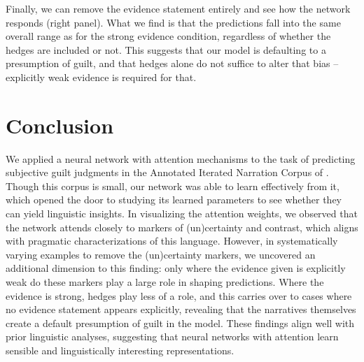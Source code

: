 \documentclass[11pt,a4paper]{article}
\newcommand{\jd}[1]{\textcolor{Red}{[jd: #1]}}
\begin{document}
Finally, we can remove the evidence statement entirely and see how the network responds (right panel). What we find is that the predictions fall into the same overall range as for the strong evidence condition, regardless of whether the hedges are included or not. This suggests that our model is defaulting to a presumption of guilt, and that hedges alone do not suffice to alter that bias -- explicitly weak evidence is required for that.


\section{Conclusion}

We applied a neural network with attention mechanisms to the task of predicting subjective guilt judgments in the Annotated Iterated Narration Corpus of \citet{Kreiss:2019}. Though this corpus is small, our network was able to learn effectively from it, which opened the door to studying its learned parameters to see whether they can yield linguistic insights. In visualizing the attention weights, we observed that the network attends closely to markers of (un)certainty and contrast, which aligns with pragmatic characterizations of this language. However, in systematically varying examples to remove the (un)certainty markers, we uncovered an additional dimension to this finding: only where the evidence given is explicitly weak do these markers play a large role in shaping predictions. Where the evidence is strong, hedges play less of a role, and this carries over to cases where no evidence statement appears explicitly, revealing that the narratives themselves create a default presumption of guilt in the model. These findings align well with prior linguistic analyses, suggesting that neural networks with attention learn sensible and linguistically interesting representations.

\end{document}
